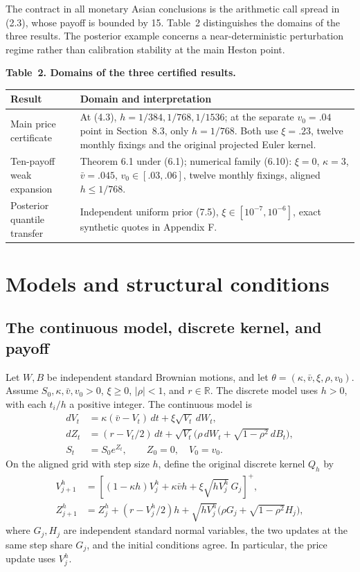 The contract in all monetary Asian conclusions is the arithmetic call spread in
(2.3), whose payoff is bounded by 15. Table~2 distinguishes the domains of the
three results. The posterior example concerns a near-deterministic perturbation
regime rather than calibration stability at the main Heston point.

\noindent\textbf{Table~2. Domains of the three certified results.}
\begin{center}
\begin{tabularx}{\textwidth}{@{}l X@{}}
\toprule
Result & Domain and interpretation \\
\midrule
Main price certificate & At (4.3), \(h=1/384,1/768,1/1536\); at the separate \(v_0=.04\) point in Section~8.3, only \(h=1/768\). Both use \(\xi=.23\), twelve monthly fixings and the original projected Euler kernel. \\
Ten-payoff weak expansion & Theorem 6.1 under (6.1); numerical family (6.10): \(\xi=0\), \(\kappa=3\), \(\bar v=.045\), \(v_0\in[.03,.06]\), twelve monthly fixings, aligned \(h\le1/768\). \\
Posterior quantile transfer & Independent uniform prior (7.5), \(\xi\in[10^{-7},10^{-6}]\), exact synthetic quotes in Appendix F. \\
\bottomrule
\end{tabularx}
\end{center}

\section{Models and structural conditions}

\subsection{The continuous model, discrete kernel, and payoff}

Let \(W,B\) be independent standard Brownian motions, and let
\(\theta=(\kappa,\bar v,\xi,\rho,v_0)\).
Assume
\(S_0,\kappa,\bar v,v_0>0\), \(\xi\ge0\), \(|\rho|<1\), and \(r\in\mathbb R\).
The discrete model uses \(h>0\), with each \(t_i/h\) a positive integer. The continuous model is
\[
\begin{aligned}
dV_t&=\kappa(\bar v-V_t)\,dt+\xi\sqrt{V_t}\,dW_t,\\
dZ_t&=(r-V_t/2)\,dt+
\sqrt{V_t}\bigl(\rho\,dW_t+\sqrt{1-\rho^2}\,dB_t\bigr),\\
S_t&=S_0e^{Z_t},\qquad Z_0=0,\quad V_0=v_0.
\end{aligned}
\tag{2.1}
\]
On the aligned grid with step size \(h\), define the original discrete kernel \(Q_h\) by
\[
\begin{aligned}
V_{j+1}^h&=\left[(1-\kappa h)V_j^h+\kappa\bar v h+
\xi\sqrt{hV_j^h}\,G_j\right]^+,\\
Z_{j+1}^h&=Z_j^h+(r-V_j^h/2)h+
\sqrt{hV_j^h}\bigl(\rho G_j+\sqrt{1-\rho^2}H_j\bigr),
\end{aligned}
\tag{2.2}
\]
where \(G_j,H_j\) are independent standard normal variables, the two updates at the same step share \(G_j\), and the initial conditions agree. In particular, the price update uses \(V_j^h\).

